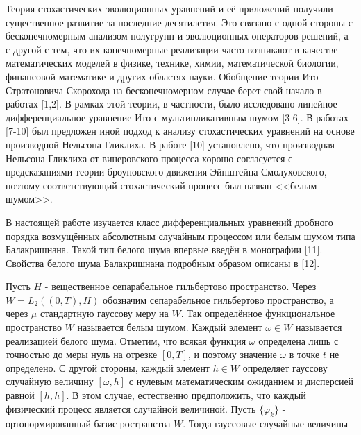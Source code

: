 


\vzmscaption


Теория стохастических эволюционных уравнений и её приложений получили существенное развитие за последние десятилетия. Это связано с одной стороны с бесконечномерным анализом полугрупп и эволюционных операторов решений, а с другой с тем, что их конечномерные реализации часто возникают в качестве математических моделей в физике, технике,
химии, математической биологии, финансовой математике и других областях науки. Обобщение теории Ито-Стратоновича-Скорохода на бесконечномерном случае берет свой начало в работах [1,2]. В рамках этой теории, в частности, было исследовано линейное дифференциальное уравнение Ито с мультипликативным шумом [3-6]. В работах [7-10] был
предложен иной подход к анализу стохастических уравнений на основе производной Нельсона-Гликлиха. В работе [10] установлено, что производная Нельсона-Гликлиха от винеровского процесса хорошо согласуется с предсказаниями теории броуновского движения Эйнштейна-Смолуховского, поэтому соответствующий стохастический процесс был назван <<белым шумом>>.

В настоящей работе изучается класс дифференциальных уравнений дробного порядка возмущённых абсолютным случайным процессом или белым шумом типа Балакришнана. Такой тип белого шума впервые введён в монографии [11]. Свойства белого шума Балакришнана подробным образом описаны в [12].

Пусть $H$ - вещественное сепарабельное гильбертово пространство. Через $W=L_{2}((0,T),H)$ обозначим сепарабельное гильбертово пространство, а через $\mu$ стандартную гауссову меру на $W$. Так определённое функциональное пространство $W$ называется белым шумом. Каждый элемент $\omega\in W$ называется реализацией белого шума. Отметим, что всякая функция $\omega$ определена лишь с точностью до меры нуль на отрезке $[0, T]$, и поэтому значение $\omega$ в точке $t$ не определено. С другой стороны, каждый элемент $h\in W$ определяет гауссову случайную величину $[\omega, h]$ с нулевым математическим ожиданием и дисперсией равной $[h, h]$. В этом случае, естественно предположить, что каждый физический процесс является случайной величиной. Пусть $\{\varphi_{k}\}$ - ортонормированный базис ространства $W$. Тогда гауссовые случайные величины

